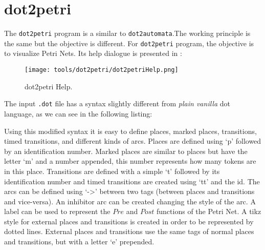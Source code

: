 % 

% 

% 

% 

% 

% 

% 

% 

\section{dot2petri}
\label{sec:dot2petri}

The \verb|dot2petri| program is a similar to \verb|dot2automata|.The 
working principle is the same but the objective is different. For \verb|dot2petri| program, the objective is to
visualize Petri Nets. Its help dialogue is presented in :
\begin{figure}[H]
  \centering
  \texttt{[image: tools/dot2petri/dot2petriHelp.png]}
  \caption{dot2petri Help.}
  \label{fig:dot2petriHelp}
\end{figure}

The input \verb|.dot| file has a syntax slightly different from \emph{plain vanilla} dot
language, as we can see in the following listing:



Using this modified syntax it is easy to define places, marked places,
transitions, timed transitions, and different kinds of arcs. Places are defined
using `p' followed by an identification number. Marked places are similar to
places but have the letter `m' and a number appended, this number represents how
many tokens are in this place. Transitions are defined with a simple `t'
followed by its identification number and timed transitions are created using `tt' and the
id. The arcs can be defined using `->' between two tags (between places and
transitions and vice-versa). An inhibitor arc can be created changing the style
of the arc. A label can be used to represent the $Pre$ and $Post$ functions of the
Petri Net. A tikz style for
external places
and transitions is created in order to be represented by dotted lines. External
places and transitions use the same tags of normal places and transitions, but
with a letter `e' prepended.

